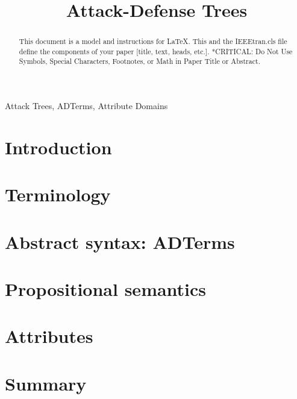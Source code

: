 \documentclass[conference]{IEEEtran}
\begin{document}
\title{Attack-Defense Trees}

\author{
}

\maketitle

\begin{abstract}
This document is a model and instructions for \LaTeX.
This and the IEEEtran.cls file define the components of your paper [title, text, heads, etc.]. *CRITICAL: Do Not Use Symbols, Special Characters, Footnotes, 
or Math in Paper Title or Abstract.
\end{abstract}

\begin{IEEEkeywords}
Attack Trees, ADTerms, Attribute Domains
\end{IEEEkeywords}

\section{Introduction}
\section{Terminology}
\section{Abstract syntax: ADTerms}
\section{Propositional semantics}
\section{Attributes}
\section{Summary}
\end{document}
